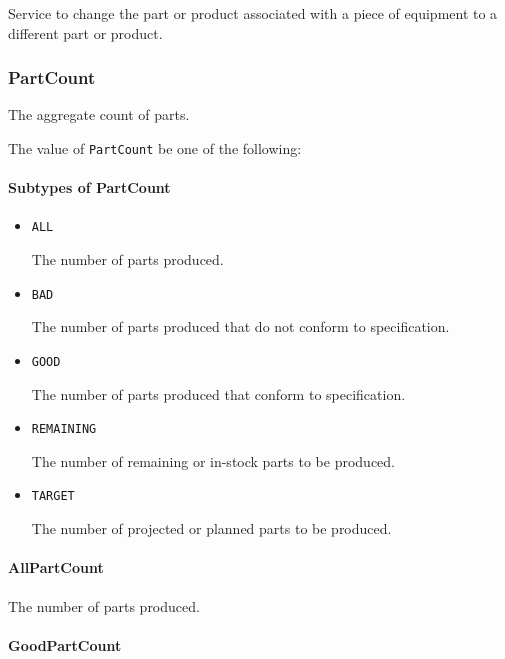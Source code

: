 Service to change the part or product associated with a piece of equipment to a different part or product.


\subsubsection{PartCount}
\label{sec:PartCount}



The aggregate count of parts.


The value of \texttt{PartCount} \MUST be one of the following: 

\FloatBarrier

\paragraph{Subtypes of PartCount}\mbox{}
\label{sec:Subtypes of PartCount}

\begin{itemize}

\item \texttt{ALL}


The number of parts produced. 

\item \texttt{BAD}


The number of parts produced that do not conform to specification.

\item \texttt{GOOD}


The number of parts produced that conform to specification.


\item \texttt{REMAINING}


The number of remaining or in-stock parts to be produced.

\item \texttt{TARGET}


The number of projected or planned parts to be produced.


\end{itemize}

\paragraph{AllPartCount}\mbox{}
\label{sec:AllPartCount}


The number of parts produced. 


\paragraph{GoodPartCount}\mbox{}
\label{sec:GoodPartCount}


